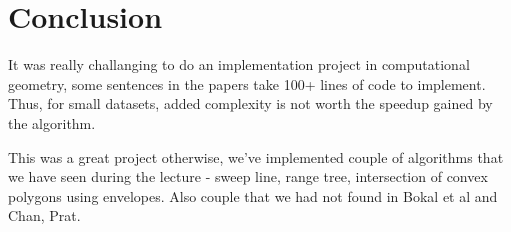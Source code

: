 \documentclass{article}
\begin{document}
\section{Conclusion}
\label{sec:conclusion}

It was really challanging to do an implementation project in computational geometry, some sentences in the papers take 100+ lines of code to implement. Thus, for small datasets, added complexity is not worth the speedup gained by the algorithm.

This was a great project otherwise, we've implemented couple of algorithms that we have seen during the lecture - sweep line, range tree, intersection of convex polygons using envelopes. Also couple that we had not found in Bokal et al and Chan, Prat.



\end{document}
